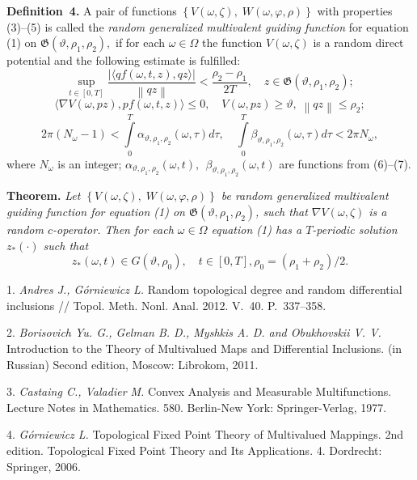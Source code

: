 \textbf{Definition~4.} A pair of functions $\left\{ {V(\omega,\zeta),\;W(\omega,\varphi,\rho )} \right\}$ with properties (3)--(5) is called the {\it random generalized multiva\-lent guiding function} for equation (1) on $\mathfrak{G}\left({\vartheta ,\rho _{1} ,\rho _{2} } \right),$ if for each $\omega\in\Omega$ the function $V(\omega,\zeta)$ is a random direct potential and the following estimate is fulfilled:
$$
\mathop {\sup}\limits_{t \in \left[ {0,T} \right]}\frac{{\left| {\langle {qf(\omega,t,z),qz} \rangle} \right|}}{{\left\|{qz} \right\|}} < \frac{{\rho _{2} - \rho _{1} }}{{2T}},\quad z\in \mathfrak{G} (\vartheta ,\rho _{1} ,\rho _{2} );
$$
$$
\langle\nabla V(\omega,pz),pf(\omega,t,z)\rangle \leqslant 0,\quad V(\omega,pz) \geqslant \vartheta ,\;\left\| {qz} \right\| \leqslant \rho _{2};
$$
$$
2\pi (N_{\omega} - 1) < \int\limits_{0}^{T} {\alpha_{\vartheta ,\rho _{1} ,\rho _{2} } (\omega,\tau )d\tau } , \quad
\int\limits_{0}^{T} {\beta _{\vartheta ,\rho _{1} ,\rho _{2} } (\omega,\tau )d\tau < 2\pi N_{\omega}},
$$
where $N_{\omega}$ is an integer; $\alpha _{\vartheta ,\rho_{1} ,\rho _{2} } (\omega,t),\,\;\beta _{\vartheta ,\rho _{1} ,\rho _{2}} (\omega,t)$ are functions from  (6)--(7).

\textbf{Theorem.} {\it
	Let $\left\{ {V(\omega,\zeta),\;W(\omega,\varphi,\rho )} \right\}$
	be random generalized multivalent guiding function for equation (1) on
	$\mathfrak{G}\left({\vartheta ,\rho _{1} ,\rho _{2} } \right)$,
	such that $\nabla V(\omega,\zeta)$ is a random $c$-operator.
	Then for each $\omega\in\Omega$ equation (1) has a $T$-periodic solution $z_{ * } ( \cdot )$  such that
}
$$
z_{ * } (\omega,t) \in G(\vartheta,\rho _{0}),\quad t \in [0,T], \rho _{0} = \left( {\rho _{1} + \rho _{2} } \right)/2.
$$
\litlist

1. {\it Andres J., G\'orniewicz L.} Random topological degree and random differential inclusions // Topol. Meth. Nonl. Anal. 2012. V.\, 40. P.\, 337--358.

2. {\it Borisovich Yu. G., Gelman B. D., Myshkis A. D. and Obukhovskii V. V.} Introduction to the Theory of Multivalued Maps and Differential Inclusions. (in Russian) Second edition, Moscow: Librokom, 2011.

3. {\it Castaing C., Valadier M.} Convex Analysis and Measurable Multifunctions. Lecture Notes in Mathematics. 580. Berlin-New York: Springer-Verlag, 1977.

4. {\it G\'{o}rniewicz L.} Topological Fixed Point Theory of Multi\-valued Mappings. 2nd edition. Topological Fixed Point Theory and Its Applications. 4. Dordrecht: Springer, 2006.

